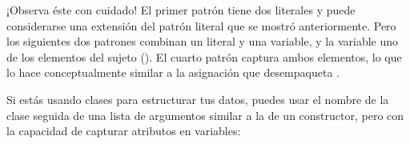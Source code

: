 \documentclass[a4,10pt,spanish]{sphinxmanual}
\begin{document}
\sphinxAtStartPar
¡Observa éste con cuidado! El primer patrón tiene dos literales y puede considerarse una extensión del patrón literal que se mostró anteriormente. Pero los siguientes dos patrones combinan un literal y una variable, y la variable  uno de los elementos del sujeto (). El cuarto patrón captura ambos elementos, lo que lo hace conceptualmente similar a la asignación que desempaqueta .

\sphinxAtStartPar
Si estás usando clases para estructurar tus datos, puedes usar el nombre de la clase seguida de una lista de argumentos similar a la de un constructor, pero con la capacidad de capturar atributos en variables:

\begin{sphinxVerbatim}[commandchars=\\\{\}]
 
     
     

 
     
          
          
          
         
         
\end{sphinxVerbatim}
\end{document}

